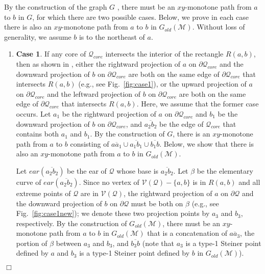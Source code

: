 \documentclass[english,runningheads,11pt]{llncs}
\def\calM{\mathcal{M}}
\def\calQ{\mathcal{Q}}
\def\calV{\mathcal{V}}
\newenvironment{proof}{\noindent {\textbf{Proof:}}\rm}{\hfill $\Box$\rm}
\begin{document}
\begin{proof}
By the construction of the graph $G$
\cite{ref:ClarksonRe87,ref:ClarksonRe88}, there must be an $xy$-monotone path from $a$ to $b$ in $G$, for which there are two possible cases. Below, we
prove in each case there is also an $xy$-monotone path from $a$
to $b$ in $G_{old}(\calM)$. Without loss of generality, we assume $b$ is
to the northeast of $a$.

\begin{enumerate}
\item
{\bf Case 1}.
If any core of $\calQ_{core}$ intersects the interior of the
rectangle $R(a,b)$, then as shown in
\cite{ref:ClarksonRe87,ref:ClarksonRe88}, either the rightward projection
of $a$ on $\partial\calQ_{core}$ and the downward projection of $b$ on
$\partial\calQ_{core}$ are both on the same edge of $\partial\calQ_{core}$
that intersects $R(a,b)$ (e.g., see Fig.~\ref{fig:case1}),
or the upward projection
of $a$ on $\partial\calQ_{core}$ and the leftward projection of $b$ on
$\partial\calQ_{core}$ are both on the same edge of $\partial\calQ_{core}$ that intersects
$R(a,b)$.  Here, we assume that the former case
occurs. Let $a_1$ be the rightward projection
of $a$ on $\partial\calQ_{core}$ and $b_1$ be the downward projection of $b$ on
$\partial\calQ_{core}$, and $\overline{a_2b_2}$ be the edge of $\calQ_{core}$ that
contains both $a_1$ and $b_1$.
By the construction of $G$, there is an
$xy$-monotone path from $a$ to $b$ consisting of
$\overline{aa_1}\cup\overline{a_1b_1}\cup\overline{b_1b}$. Below, we show
that there is also an $xy$-monotone path from $a$ to $b$ in
$G_{old}(\calM)$.

Let $ear(\overline{a_2b_2})$ be the ear of $\calQ$ whose base is
$\overline{a_2b_2}$. Let $\beta$ be the elementary curve of
$ear(\overline{a_2b_2})$. Since no vertex of $\calV(\calQ)-\{a,b\}$ is in $R(a,b)$
and all extreme points of $\calQ$ are in $\calV(\calQ)$, the rightward
projection of $a$ on $\partial\calQ$ and the downward projection of
$b$ on $\partial\calQ$ must be both on $\beta$ (e.g., see
Fig.~\ref{fig:case1new}); we denote these two
projection points by $a_3$ and $b_3$, respectively. By the
construction of $G_{old}(\calM)$, there must be an $xy$-monotone path
from $a$ to $b$ in $G_{old}(\calM)$ that is a concatenation of
$\overline{aa_3}$, the portion of $\beta$ between $a_3$ and $b_3$, and
$\overline{b_3b}$ (note that $a_3$ is a type-1 Steiner point defined by $a$ and $b_3$ is a type-1
Steiner point defined by $b$ in $G_{old}(\calM)$).



\end{enumerate}
\end{proof}
\end{document}
